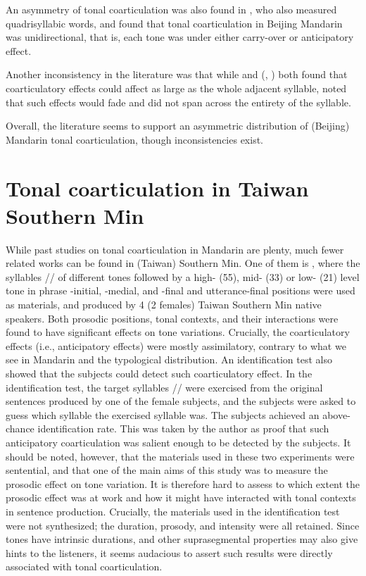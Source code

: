 An asymmetry of tonal coarticulation was also found in \cite{LinYan1991}, who also measured quadrisyllabic words, and found that tonal coarticulation in Beijing Mandarin was unidirectional, that is, each tone was under either carry-over or anticipatory effect.

Another inconsistency in the literature was that while \cite{Shen1990} and \citeauthor{Xu1994a} (\citeyear{Xu1994a}, \citeyear{Xu1997}) both found that coarticulatory effects could affect as large as the whole adjacent syllable, \cite{LinYan1991} noted that such effects would fade and did not span across the entirety of the syllable.

Overall, the literature seems to support an asymmetric distribution of (Beijing) Mandarin tonal coarticulation, though inconsistencies exist.

\section{Tonal coarticulation in Taiwan Southern Min}
While past studies on tonal coarticulation in Mandarin are plenty, much fewer related works can be found in (Taiwan) Southern Min. One of them is \cite{Peng1997}, where the syllables // of different tones followed by a high- (55), mid- (33) or low- (21) level tone in phrase -initial, -medial, and -final and utterance-final positions were used as materials, and produced by 4 (2 females) Taiwan Southern Min native speakers. Both prosodic positions, tonal contexts, and their interactions were found to have significant effects on tone variations. Crucially, the coarticulatory effects (i.e., anticipatory effects) were mostly assimilatory, contrary to what we see in Mandarin and the typological distribution. An identification test also showed that the subjects could detect such coarticulatory effect. In the identification test, the target syllables // were exercised from the original sentences produced by one of the female subjects, and the subjects were asked to guess which syllable the exercised syllable was. The subjects achieved an above-chance identification rate. This was taken by the author as proof that such anticipatory coarticulation was salient enough to be detected by the subjects. It should be noted, however, that  the materials used in these two experiments were sentential, and that one of the main aims of this study was to measure the prosodic effect on tone variation. It is therefore hard to assess to which extent the prosodic effect was at work and how it might have interacted with tonal contexts in sentence production. Crucially, the materials used in the identification test were not synthesized; the duration, prosody, and intensity were all retained. Since tones have intrinsic durations, and other suprasegmental properties may also give hints to the listeners, it seems audacious to assert such results were directly associated with tonal coarticulation.

